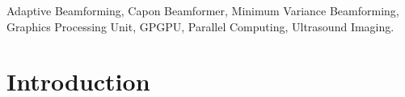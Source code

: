 \documentclass[12pt,journal,onecolumn]{IEEEtran}
\begin{document}







\maketitle


\begin{abstract}
...
\end{abstract}

\begin{IEEEkeywords}
Adaptive Beamforming, Capon Beamformer, Minimum Variance Beamforming, Graphics Processing Unit, GPGPU, Parallel Computing, Ultrasound Imaging.
\end{IEEEkeywords}






%
\IEEEpeerreviewmaketitle



\section{Introduction}
% 
% 
% 
% 
\end{document}
